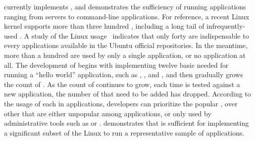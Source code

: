 







\Thelibos{} currently implements \graphenesyscallnum{} \linuxapis{},
and demonstrates 
the sufficiency of running applications ranging from servers to command-line applications.
For reference,
a recent Linux kernel supports more than three hundred \linuxapis{}, including a long tail of infrequently-used \linuxapis{}.
A study of the Linux \linuxapi{} usage~\cite{tsai16apistudy}
indicates that only forty \linuxapis{} are indispensable to every applications available in the Ubuntu official repositories.
In the meantime, more than a hundred \linuxapis{} are used by only a single application,
or no application at all.
The development of \thelibos{} begins with
implementing twelve basic \linuxapis{} needed for running a ``hello world'' application,
such as , , and ,
and then gradually grows the count of \linuxapis{}.
As the count of \linuxapis{} continues to grow,
each time \thelibos{} is tested against a new application, the number of \linuxapis{} that need to be added
has dropped.
According to the usage of each \linuxapi{} in applications,
developers can prioritize the popular \linuxapis{}, over other \linuxapis{} that are either unpopular among applications, or only used by administrative tools such as  or .
\thelibos{} demonstrates that
\thehostabi{} is sufficient for implementing
a significant subset of the Linux \linuxapis{} to run
a representative sample of applications.



